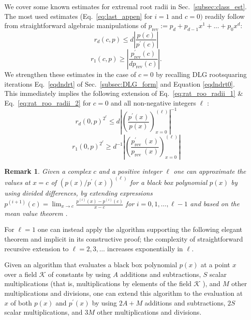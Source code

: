 \documentclass[sigconf]{acmart}
\newtheorem{remark}{Remark}
\begin{document}
We cover some known estimates for extremal root radii in Sec.~\ref{subsec:class_est}. The most used estimates (Eq.~\ref{eq:last_appen} for $i=1$ and $c=0)$ readily follow from straightforward algebraic manipulations of $p_\text{rev}:=p_d+p_{d-1}x^1+...+p_0x^d$:
\begin{equation}\label{eq:rat_roo_radii_1}
r_{d}(c, p) \leq d\left|\frac{p(c)}{p^{\prime}(c)}\right|
\end{equation}
\begin{equation}\label{eq:rat_roo_radii_2}
 r_{1}(c, p) \geq\left|\frac{p_{\mathrm{rev}}^{\prime}(c)}{d p_{\mathrm{rev}}(c)}\right| .
\end{equation}
We strengthen these estimates in the case of $c=0$ by recalling DLG rootsquaring iterations Eq.~\ref{eqdndrt} of Sec.~\ref{subsec:DLG_form} and Equation \ref{eqdndrt0}. This immediately implies the following extension of Eq.~\ref{eq:rat_roo_radii_1} \& Eq.~\ref{eq:rat_roo_radii_2} for $c=0$ and all non-negative integers $\ell$ :
\begin{equation}\label{eq:rat_roo_radii_3}
r_{d}(0, p)^{2^{\ell}} \leq d \left|\left(\frac{p^{\prime}(x)}{p(x)}\right)_{x=0}^{(\ell)}\right|^{-1}
\end{equation}
\begin{equation}\label{eq:rat_roo_radii_4}
r_{1}(0, p)^{2^{\ell}} \geq d^{-1}\left|\left(\frac{ p^{\prime}_{\text {rev }}(x)}{p_{\text {rev }}(x)}\right)_{x=0}^{(\ell)}\right|
\end{equation}
\begin{remark}\label{rem:fin_diff}
 Given a complex $c$ and a positive integer $\ell$ one can approximate the values at $x=c$ of $\left(p(x) / p^{\prime}(x)\right)^{(\ell)}$ for a black box polynomial $p(x)$ by using divided differences, by extending expressions $p^{(i+1)}(c)=\lim _{x \rightarrow c} \frac{p^{(i)}(x)-p^{(i)}(c)}{x-c}$ for $i=0,1, \ldots, \ell-1$ and based on the mean value theorem \cite{Boor1995DividedD}.
\end{remark}

For $\ell=1$ one can instead apply the algorithm supporting the following elegant theorem and implicit in its constructive proof; the complexity of straightforward recursive extension to $\ell=2,3, \ldots$ increases exponentially in $\ell$.

\begin{theorem}
Given an algorithm that evaluates a black box polynomial $p(x)$ at a point $x$ over a field $\mathcal{K}$ of constants by using $A$ additions and subtractions, $S$ scalar multiplications (that is, multiplications by elements of the field $\mathcal{K}$ ), and $M$ other multiplications and divisions, one can extend this algorithm to the evaluation at $x$ of both $p(x)$ and $p^{\prime}(x)$ by using $2 A+M$ additions and subtractions, $2 S$ scalar multiplications, and $3 M$ other multiplications and divisions.
\end{theorem}
\end{document}
